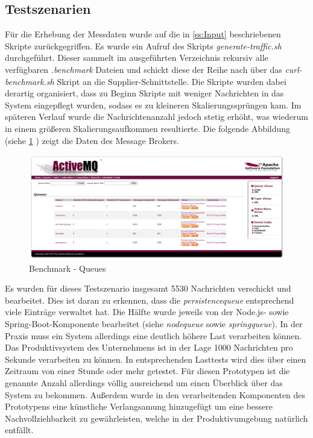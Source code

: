\subsection{Testszenarien}
Für die Erhebung der Messdaten wurde auf die in \ref{ss:Input} beschriebenen Skripte zurückgegriffen. Es wurde ein Aufruf des Skripts \emph{generate-traffic.sh} durchgeführt. Dieser sammelt im ausgeführten Verzeichnis rekursiv alle verfügbaren \emph{.benchmark} Dateien und schickt diese der Reihe nach über das \emph{curl-benchmark.sh} Skript an die Supplier-Schnittstelle. Die Skripte wurden dabei derartig organisiert, dass zu Beginn Skripte mit weniger Nachrichten in das System eingepflegt wurden, sodass es zu kleineren Skalierungssprüngen kam. Im späteren Verlauf wurde die Nachrichtenanzahl jedoch stetig erhöht, was wiederum in einem größeren Skalierungsaufkommen resultierte. Die folgende Abbildung (siehe \ref{fig:benchmarkQueues} ) zeigt die Daten des Message Brokers. 

\begin{figure}[ht!]
	\centering
	\includegraphics[width=\linewidth]{kapitel/problemloesung/implementierung/_img/benchmark-queues}
	\caption[Benchmark - Queues]{Benchmark - Queues}
	\label{fig:benchmarkQueues}
\end{figure}

Es wurden für dieses Testszenario insgesamt 5530 Nachrichten verschickt und bearbeitet. Dies ist daran zu erkennen, dass die \emph{persistencequeue} entsprechend viele Einträge verwaltet hat. Die Hälfte wurde jeweils von der Node.js- sowie Spring-Boot-Komponente bearbeitet (siehe \emph{nodequeue} sowie \emph{springqueue}). In der Praxis muss ein System allerdings eine deutlich höhere Last verarbeiten können. Das Produktivsystem des Unternehmens ist in der Lage 1000 Nachrichten pro Sekunde verarbeiten zu können. In entsprechenden Lasttests wird dies über einen Zeitraum von einer Stunde oder mehr getestet. Für diesen Prototypen ist die genannte Anzahl allerdings völlig ausreichend um einen Überblick über das System zu bekommen. Außerdem wurde in den verarbeitenden Komponenten des Prototypens eine künstliche Verlangsamung hinzugefügt um eine bessere Nachvollziehbarkeit zu gewährleisten, welche in der Produktivumgebung natürlich entfällt.

